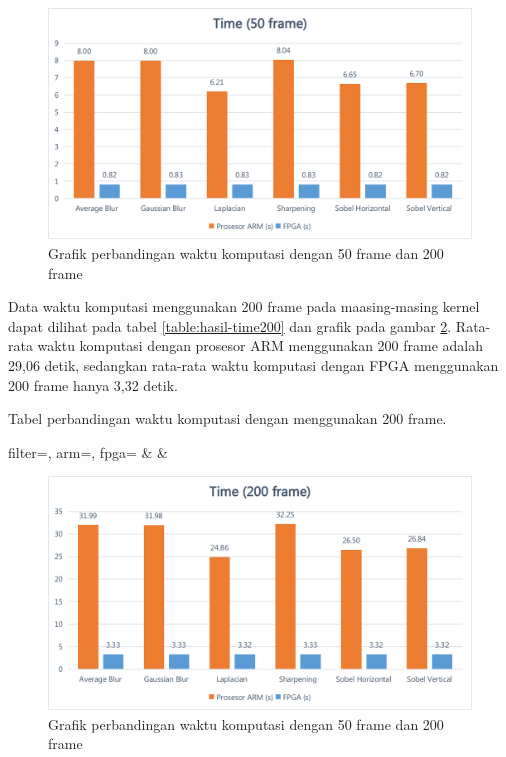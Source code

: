 \begin{figure}[ht]
    \centering
    \includegraphics[width=0.81\linewidth, center]{images/chart/chart-time50.png}
    \caption{Grafik perbandingan waktu komputasi dengan 50 frame dan 200 frame}
    \label{fig:chart-time50}
\end{figure}

Data waktu komputasi menggunakan 200 frame pada maasing-masing kernel dapat dilihat pada tabel \ref{table:hasil-time200} dan grafik pada gambar \ref{fig:chart-time200}. Rata-rata waktu komputasi dengan prosesor ARM menggunakan 200 frame adalah 29,06 detik, sedangkan rata-rata waktu komputasi dengan FPGA menggunakan 200 frame hanya 3,32 detik.
\begin{atable}
    \caption{Tabel perbandingan waktu komputasi dengan menggunakan 200 frame.}
    \label{table:hasil-time200}
        {
            filter=\filter, 
            arm=\arm, 
            fpga=\fpga}
        {
            \filter & 
            \arm & 
            \fpga }
\end{atable}

\begin{figure}[ht]
    \centering
    \includegraphics[width=0.81\linewidth, center]{images/chart/chart-time200.png}
    \caption{Grafik perbandingan waktu komputasi dengan 50 frame dan 200 frame}
    \label{fig:chart-time200}
\end{figure}

